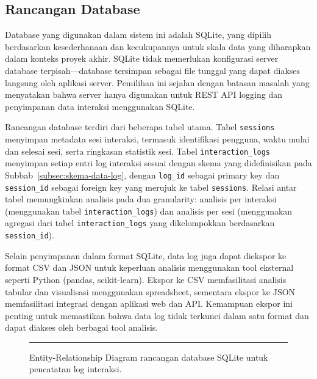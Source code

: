 \documentclass[12pt,oneside]{report}
\begin{document}
\subsection{Rancangan Database}
\label{subsec:rancangan-database}

Database yang digunakan dalam sistem ini adalah SQLite, yang dipilih berdasarkan kesederhanaan dan kecukupannya untuk skala data yang diharapkan dalam konteks proyek akhir. SQLite tidak memerlukan konfigurasi server database terpisah—database tersimpan sebagai file tunggal yang dapat diakses langsung oleh aplikasi server. Pemilihan ini sejalan dengan batasan masalah yang menyatakan bahwa server hanya digunakan untuk REST API logging dan penyimpanan data interaksi menggunakan SQLite.

Rancangan database terdiri dari beberapa tabel utama. Tabel \texttt{sessions} menyimpan metadata sesi interaksi, termasuk identifikasi pengguna, waktu mulai dan selesai sesi, serta ringkasan statistik sesi. Tabel \texttt{interaction\_logs} menyimpan setiap entri log interaksi sesuai dengan skema yang didefinisikan pada Subbab~\ref{subsec:skema-data-log}, dengan \texttt{log\_id} sebagai primary key dan \texttt{session\_id} sebagai foreign key yang merujuk ke tabel \texttt{sessions}. Relasi antar tabel memungkinkan analisis pada dua granularity: analisis per interaksi (menggunakan tabel \texttt{interaction\_logs}) dan analisis per sesi (menggunakan agregasi dari tabel \texttt{interaction\_logs} yang dikelompokkan berdasarkan \texttt{session\_id}).

Selain penyimpanan dalam format SQLite, data log juga dapat diekspor ke format CSV dan JSON untuk keperluan analisis menggunakan tool eksternal seperti Python (pandas, scikit-learn). Ekspor ke CSV memfasilitasi analisis tabular dan visualisasi menggunakan spreadsheet, sementara ekspor ke JSON memfasilitasi integrasi dengan aplikasi web dan API. Kemampuan ekspor ini penting untuk memastikan bahwa data log tidak terkunci dalam satu format dan dapat diakses oleh berbagai tool analisis.

\begin{figure}[H]
\centering
\rule{0.7\textwidth}{6cm}
\caption{Entity-Relationship Diagram rancangan database SQLite untuk pencatatan log interaksi.}
\label{fig:er-database}
\end{figure}

\end{document}
